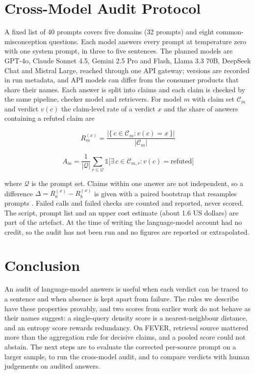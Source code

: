 \documentclass[11pt,a4paper]{article}
\begin{document}
\section{Cross-Model Audit Protocol}

A fixed list of 40 prompts covers five domains (32 prompts) and eight common-misconception questions. Each model answers every prompt at temperature zero with one system prompt, in three to five sentences. The planned models are GPT-4o, Claude Sonnet 4.5, Gemini 2.5 Pro and Flash, Llama 3.3 70B, DeepSeek Chat and Mistral Large, reached through one API gateway; versions are recorded in run metadata, and API models can differ from the consumer products that share their names. Each answer is split into claims and each claim is checked by the same pipeline, checker model and retrievers. For model $m$ with claim set $\mathcal{C}_m$ and verdict $v(c)$ the claim-level rate of a verdict $x$ and the share of answers containing a refuted claim are

\begin{equation}
R_m^{(x)} = \frac{\bigl|\{\, c \in \mathcal{C}_m : v(c) = x \,\}\bigr|}{|\mathcal{C}_m|}
\end{equation}

\begin{equation}
A_m = \frac{1}{|\mathcal{Q}|}\sum_{r \in \mathcal{Q}} \mathbb{1}\bigl[\exists\, c \in \mathcal{C}_{m,r} : v(c) = \text{refuted}\bigr]
\end{equation}

where $\mathcal{Q}$ is the prompt set. Claims within one answer are not independent, so a difference $\Delta = R_a^{(x)} - R_b^{(x)}$ is given with a paired bootstrap that resamples prompts \citep{efron1979}. Failed calls and failed checks are counted and reported, never scored. The script, prompt list and an upper cost estimate (about 1.6 US dollars) are part of the artefact. At the time of writing the language-model account had no credit, so the audit has not been run and no figures are reported or extrapolated.

\section{Conclusion}

An audit of language-model answers is useful when each verdict can be traced to a sentence and when absence is kept apart from failure. The rules we describe have these properties provably, and two scores from earlier work do not behave as their names suggest: a single-query density score is a nearest-neighbour distance, and an entropy score rewards redundancy. On FEVER, retrieval source mattered more than the aggregation rule for decisive claims, and a pooled score could not abstain. The next steps are to evaluate the corrected per-source prompt on a larger sample, to run the cross-model audit, and to compare verdicts with human judgements on audited answers.
\end{document}
